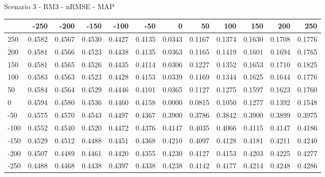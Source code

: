 Scenario 3 - RM3 - nRMSE - MAP
\begin{tabular}{lrrrrrrrrrrr}
\toprule
{} &   -250 &   -200 &   -150 &   -100 &   -50  &    0   &    50  &    100 &    150 &    200 &    250 \\
\midrule
 250 & 0.4582 & 0.4567 & 0.4530 & 0.4427 & 0.4135 & 0.0343 & 0.1167 & 0.1374 & 0.1630 & 0.1708 & 0.1776 \\
 200 & 0.4581 & 0.4566 & 0.4523 & 0.4438 & 0.4135 & 0.0363 & 0.1165 & 0.1419 & 0.1601 & 0.1694 & 0.1765 \\
 150 & 0.4581 & 0.4565 & 0.4526 & 0.4435 & 0.4114 & 0.0306 & 0.1227 & 0.1352 & 0.1653 & 0.1710 & 0.1825 \\
 100 & 0.4583 & 0.4563 & 0.4523 & 0.4428 & 0.4153 & 0.0339 & 0.1169 & 0.1344 & 0.1625 & 0.1644 & 0.1776 \\
 50  & 0.4584 & 0.4564 & 0.4529 & 0.4446 & 0.4101 & 0.0365 & 0.1127 & 0.1275 & 0.1597 & 0.1623 & 0.1760 \\
 0   & 0.4594 & 0.4580 & 0.4536 & 0.4460 & 0.4158 & 0.0000 & 0.0815 & 0.1050 & 0.1277 & 0.1392 & 0.1548 \\
-50  & 0.4575 & 0.4570 & 0.4543 & 0.4497 & 0.4367 & 0.3900 & 0.3786 & 0.3842 & 0.3900 & 0.3899 & 0.3975 \\
-100 & 0.4552 & 0.4540 & 0.4520 & 0.4472 & 0.4376 & 0.4147 & 0.4035 & 0.4066 & 0.4115 & 0.4147 & 0.4186 \\
-150 & 0.4529 & 0.4512 & 0.4488 & 0.4451 & 0.4368 & 0.4210 & 0.4097 & 0.4128 & 0.4181 & 0.4211 & 0.4240 \\
-200 & 0.4507 & 0.4489 & 0.4461 & 0.4420 & 0.4355 & 0.4230 & 0.4127 & 0.4153 & 0.4203 & 0.4225 & 0.4277 \\
-250 & 0.4488 & 0.4468 & 0.4438 & 0.4397 & 0.4338 & 0.4238 & 0.4142 & 0.4177 & 0.4214 & 0.4248 & 0.4286 \\
\bottomrule
\end{tabular}

